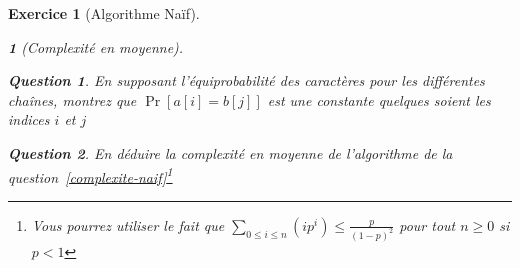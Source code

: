 \documentclass{article}
\theoremstyle{exostyle}
\newtheorem{exo}{Exercice}
\theoremstyle{partiestyle}
\newtheorem{partie}{}[exo]
\theoremstyle{questionstyle}
\newtheorem{questionpartie}{Question}[partie]
\begin{document}
\begin{exo}[Algorithme Naïf]
\begin{partie}[Complexité en moyenne]
        \begin{questionpartie}
            En supposant l'équiprobabilité des caractères pour les différentes chaînes, montrez que $\Pr [a[i] = b[j]]$ est une constante quelques soient les indices $i$ et $j$
        \end{questionpartie}
        \begin{questionpartie}
            En déduire la complexité en moyenne de l'algorithme de la question~\ref{complexite-naif}\footnote{Vous pourrez utiliser le fait que $\sum_{0\leq i\leq n}(ip^i) \leq \frac{p}{(1-p)^2}$ pour tout $n\geq 0$ si $p<1$}
        \end{questionpartie}

    \end{partie}

\end{exo}
\end{document}
